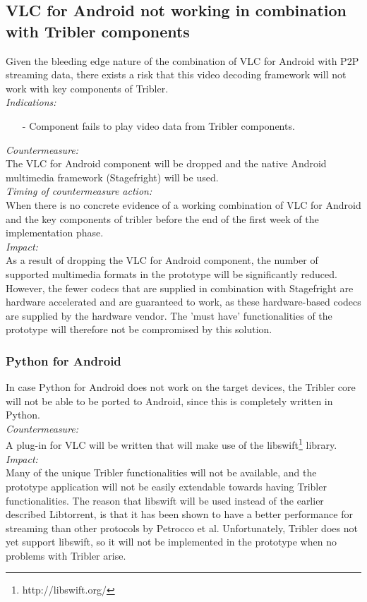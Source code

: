 \subsection{VLC for Android not working in combination with Tribler components}
Given the bleeding edge nature of the combination of VLC for Android with P2P streaming data, there exists a risk that this video decoding framework will not work with key components of Tribler.\\
\newline
\textit{Indications:}
\begin{itemize}
	\item[-]Component fails to play video data from Tribler components.
\end{itemize}
\textit{Countermeasure:}\\
The VLC for Android component will be dropped and the native Android multimedia framework (Stagefright) will be used.\\
\newline
\textit{Timing of countermeasure action:}\\
When there is no concrete evidence of a working combination of VLC for Android and the key components of tribler before the end of the first week of the implementation phase.\\
\newline
\textit{Impact:}\\
As a result of dropping the VLC for Android component, the number of supported multimedia formats in the prototype will be significantly reduced. However, the fewer codecs that are supplied in combination with Stagefright are hardware accelerated and are guaranteed to work, as these hardware-based codecs are supplied by the hardware vendor. The 'must have' functionalities of the prototype will therefore not be compromised by this solution.\\ 
\subsubsection{Python for Android}
In case Python for Android does not work on the target devices, the Tribler core will not be able to be ported to Android, since this is completely written in Python.\\
\newline
\textit{Countermeasure:}\\
A plug-in for VLC will be written that will make use of the libswift\footnote{http://libswift.org/} library.\\
\newline
\textit{Impact:}\\
Many of the unique Tribler functionalities will not be available, and the prototype application will not be easily extendable towards having Tribler functionalities. The reason that libswift will be used instead of the earlier described Libtorrent, is that it has been shown to have a better performance for streaming than other protocols by Petrocco et al\cite{libswift12}. Unfortunately, Tribler does not yet support libswift, so it will not be implemented in the prototype when no problems with Tribler arise.
